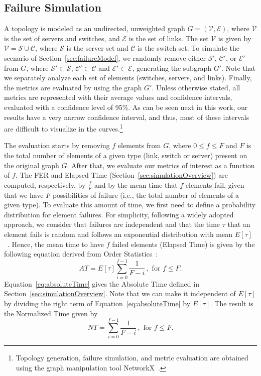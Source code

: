 \subsection{Failure Simulation}
\label{sec:failureSimMethodology}

A topology is modeled as an undirected, unweighted graph $G=(\mathcal{V},\mathcal{E})$, where $\mathcal{V}$ is the set of servers and switches, and $\mathcal{E}$ is the set of links. The set $\mathcal{V}$ is given by $\mathcal{V}=\mathcal{S} \cup \mathcal{C}$, where $\mathcal{S}$ is the server set and $\mathcal{C}$ is the switch set. To simulate the scenario of Section~\ref{sec:failureModel}, we randomly remove either $\mathcal{S'}$, $\mathcal{C}'$, or $\mathcal{E}'$ from $G$, where $\mathcal{S}'\subset \mathcal{S}$, $\mathcal{C}'\subset \mathcal{C}$ and $\mathcal{E}'\subset \mathcal{E}$, generating the subgraph $G'$. Note that we separately analyze each set of elements (switches, servers, and links). Finally, the metrics are evaluated by using the graph $G'$. Unless otherwise stated, all metrics are represented with their average values and confidence intervals, evaluated with a confidence level of 95\%. As can be seen next in this work, our results have a very narrow confidence interval, and thus, most of these intervals are difficult to visualize in the curves.\footnote{Topology generation, failure simulation, and metric evaluation are obtained using the graph manipulation tool NetworkX~\cite{hagberg2008exploring}.}

The evaluation starts by removing $f$ elements from $G$, where $0 \leq  f \leq F $ and $F$ is the total number of elements of a given type (link, switch or server) present on the original graph $G$. After that, we evaluate our metrics of interest as a function of $f$. The FER and Elapsed Time (Section~\ref{sec:simulationOverview}) are computed, respectively, by $\frac{f}{F}$ and by the mean time that $f$ elements fail, given that we have $F$ possibilities of failure (i.e., the total number of elements of a given type). To evaluate this amount of time, we first need to define a probability distribution for element failures. For simplicity, following a widely adopted approach, we consider that failures are independent and that the time $\tau$ that an element fails is random and follows an exponential distribution with mean $E[\tau]$~\cite{egeland2009availability,rahman2010survivable}. 
Hence, the mean time to have $f$ failed elements (Elapsed Time) is given by the following equation derived from Order Statistics~\cite{barlow1975statistical}: 
\begin{equation}
AT = E[\tau] \sum_{i=0}^{f-1} \frac{1}{F - i} \,, \text{ for } f \leq F.
\label{eq:absoluteTime}
\end{equation}
Equation~\ref{eq:absoluteTime} gives the Absolute Time defined in Section~\ref{sec:simulationOverview}. Note that we can make it independent of $E[\tau]$ by dividing the right term of Equation~\ref{eq:absoluteTime} by $E[\tau]$. The result is the Normalized Time given by
\begin{equation}
NT = \sum_{i=0}^{f-1} \frac{1}{F - i} \,, \text{ for } f \leq F.
\label{eq:normalizedTime}
\end{equation}

